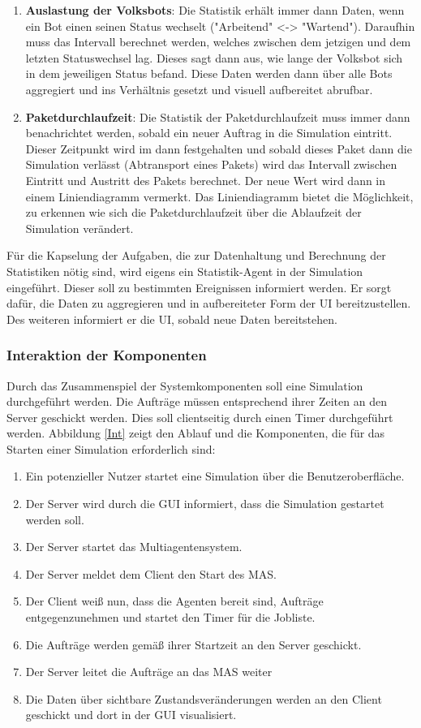 \begin{enumerate}
	\item \textbf{Auslastung der Volksbots}: Die Statistik erhält immer dann Daten, wenn ein Bot einen seinen Status wechselt ("Arbeitend" <-> "Wartend"). Daraufhin muss das Intervall berechnet werden, welches zwischen dem jetzigen und dem letzten Statuswechsel lag. Dieses sagt dann aus, wie lange der Volksbot sich in dem jeweiligen Status befand. Diese Daten werden dann über alle Bots aggregiert und ins Verhältnis gesetzt und visuell aufbereitet abrufbar.
	\item \textbf{Paketdurchlaufzeit}: Die Statistik der Paketdurchlaufzeit muss immer dann benachrichtet werden, sobald ein neuer Auftrag in die Simulation eintritt. Dieser Zeitpunkt wird im dann festgehalten und sobald dieses Paket dann die Simulation verlässt (Abtransport eines Pakets) wird das Intervall zwischen Eintritt und Austritt des Pakets berechnet. Der neue Wert wird dann in einem Liniendiagramm vermerkt. Das Liniendiagramm bietet die Möglichkeit, zu erkennen wie sich die Paketdurchlaufzeit über die Ablaufzeit der Simulation verändert.
\end{enumerate}

Für die Kapselung der Aufgaben, die zur Datenhaltung und Berechnung der Statistiken nötig sind, wird eigens ein Statistik-Agent in der Simulation eingeführt. Dieser soll zu bestimmten Ereignissen informiert werden. Er sorgt dafür, die Daten zu aggregieren und in aufbereiteter Form der UI bereitzustellen. Des weiteren informiert er die UI, sobald neue Daten bereitstehen.

\subsubsection{Interaktion der Komponenten} \label{Interaktion der Komponenten}
Durch das Zusammenspiel der Systemkomponenten soll eine Simulation durchgeführt werden. Die Aufträge müssen entsprechend ihrer Zeiten an den Server geschickt werden. Dies soll clientseitig durch einen Timer durchgeführt werden. Abbildung \ref{Int} zeigt den Ablauf und die Komponenten, die für das Starten einer Simulation erforderlich sind: 
\begin{enumerate}
\item Ein potenzieller Nutzer startet eine Simulation über die Benutzeroberfläche.
\item Der Server wird durch die GUI informiert, dass die Simulation gestartet werden soll.
\item Der Server startet das Multiagentensystem.
\item Der Server meldet dem Client den Start des MAS.
\item Der Client weiß nun, dass die Agenten bereit sind, Aufträge entgegenzunehmen und startet den Timer für die Jobliste.
\item Die Aufträge werden gemäß ihrer Startzeit an den Server geschickt.
\item Der Server leitet die Aufträge an das MAS weiter
\item Die Daten über sichtbare Zustandsveränderungen werden an den Client geschickt und dort in der GUI visualisiert.
\end{enumerate}

